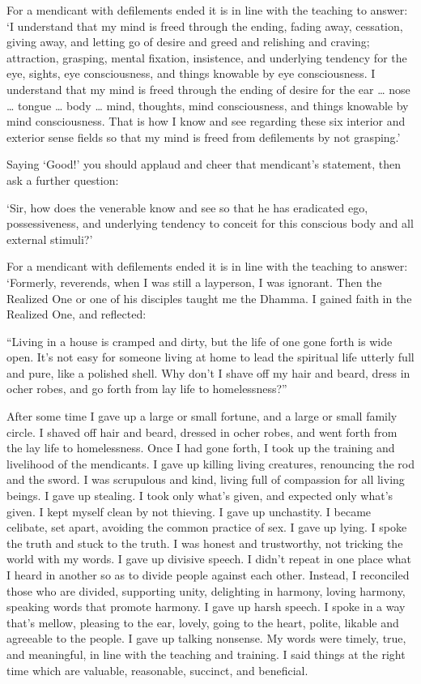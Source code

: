 \documentclass[12pt,openany]{book}%
\begin{document}
For a mendicant with defilements ended it is in line with the teaching to answer: ‘I understand that my mind is freed through the ending, fading away, cessation, giving away, and letting go of desire and greed and relishing and craving; attraction, grasping, mental fixation, insistence, and underlying tendency for the eye, sights, eye consciousness, and things knowable by eye consciousness. I understand that my mind is freed through the ending of desire for the ear … nose … tongue … body … mind, thoughts, mind consciousness, and things knowable by mind consciousness. That is how I know and see regarding these six interior and exterior sense fields so that my mind is freed from defilements by not grasping.’ 

Saying ‘Good!’ you should applaud and cheer that mendicant’s statement, then ask a further question: 

‘Sir, how does the venerable know and see so that he has eradicated ego, possessiveness, and underlying tendency to conceit for this conscious body and all external stimuli?’ 

For a mendicant with defilements ended it is in line with the teaching to answer: ‘Formerly, reverends, when I was still a layperson, I was ignorant. Then the Realized One or one of his disciples taught me the Dhamma. I gained faith in the Realized One, and reflected: 

“Living in a house is cramped and dirty, but the life of one gone forth is wide open. It’s not easy for someone living at home to lead the spiritual life utterly full and pure, like a polished shell. Why don’t I shave off my hair and beard, dress in ocher robes, and go forth from lay life to homelessness?” 

After some time I gave up a large or small fortune, and a large or small family circle. I shaved off hair and beard, dressed in ocher robes, and went forth from the lay life to homelessness. Once I had gone forth, I took up the training and livelihood of the mendicants. I gave up killing living creatures, renouncing the rod and the sword. I was scrupulous and kind, living full of compassion for all living beings. I gave up stealing. I took only what’s given, and expected only what’s given. I kept myself clean by not thieving. I gave up unchastity. I became celibate, set apart, avoiding the common practice of sex. I gave up lying. I spoke the truth and stuck to the truth. I was honest and trustworthy, not tricking the world with my words. I gave up divisive speech. I didn’t repeat in one place what I heard in another so as to divide people against each other. Instead, I reconciled those who are divided, supporting unity, delighting in harmony, loving harmony, speaking words that promote harmony. I gave up harsh speech. I spoke in a way that’s mellow, pleasing to the ear, lovely, going to the heart, polite, likable and agreeable to the people. I gave up talking nonsense. My words were timely, true, and meaningful, in line with the teaching and training. I said things at the right time which are valuable, reasonable, succinct, and beneficial. 
\end{document}
